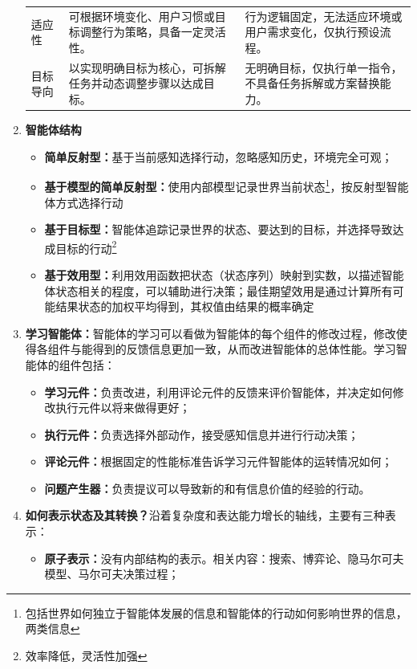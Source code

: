 \documentclass[../main.tex]{subfiles}
\begin{document}
\begin{enumerate}
\begin{table}[H]
\begin{tabular}{p{2.6cm}p{6.2cm}p{6.2cm}}
        适应性 & 可根据环境变化、用户习惯或目标调整行为策略，具备一定灵活性。 & 行为逻辑固定，无法适应环境或用户需求变化，仅执行预设流程。 \\
        目标导向 & 以实现明确目标为核心，可拆解任务并动态调整步骤以达成目标。 & 无明确目标，仅执行单一指令，不具备任务拆解或方案替换能力。 \\
        \bottomrule
    \end{tabular}
\end{table}
    \item \textbf{智能体结构}
    \begin{itemize}
        \item \textbf{简单反射型：}基于当前感知选择行动，忽略感知历史，环境完全可观；
        \item \textbf{基于模型的简单反射型：}使用内部模型记录世界当前状态\footnote{包括世界如何独立于智能体发展的信息和智能体的行动如何影响世界的信息，两类信息}，按反射型智能体方式选择行动
        \item \textbf{基于目标型：}智能体追踪记录世界的状态、要达到的目标，并选择导致达成目标的行动\footnote{效率降低，灵活性加强}
        \item \textbf{基于效用型：}利用效用函数把状态（状态序列）映射到实数，以描述智能体状态相关的程度，可以辅助进行决策；最佳期望效用是通过计算所有可能结果状态的加权平均得到，其权值由结果的概率确定
    \end{itemize}
    \item \textbf{学习智能体：}智能体的学习可以看做为智能体的每个组件的修改过程，修改使得各组件与能得到的反馈信息更加一致，从而改进智能体的总体性能。学习智能体的组件包括：
    \begin{itemize}
        \item \textbf{学习元件：}负责改进，利用评论元件的反馈来评价智能体，并决定如何修改执行元件以将来做得更好；
        \item \textbf{执行元件：}负责选择外部动作，接受感知信息并进行行动决策；
        \item \textbf{评论元件：}根据固定的性能标准告诉学习元件智能体的运转情况如何；
        \item \textbf{问题产生器：}负责提议可以导致新的和有信息价值的经验的行动。
    \end{itemize}
    \item \textbf{如何表示状态及其转换？}沿着复杂度和表达能力增长的轴线，主要有三种表示：
    \begin{itemize}
        \item \textbf{原子表示：}没有内部结构的表示。相关内容：搜索、博弈论、隐马尔可夫模型、马尔可夫决策过程；

\end{itemize}
\end{enumerate}
\end{document}
